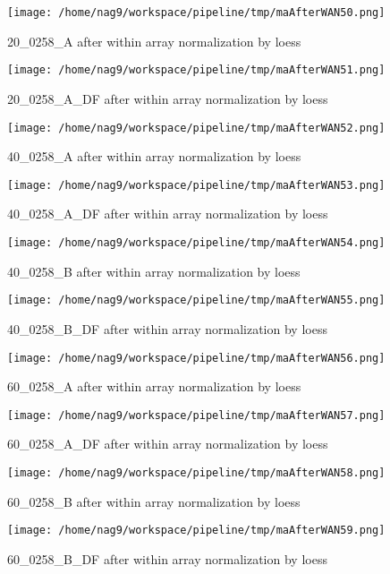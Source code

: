 \documentclass[titlepage]{article}
\begin{document}
\begin{figure}[htb!]
\centering\texttt{[image: /home/nag9/workspace/pipeline/tmp/maAfterWAN50.png]}
\caption{20\_0258\_A after within array normalization by loess}
 \end{figure}\pagebreak
\begin{figure}[htb!]
\centering\texttt{[image: /home/nag9/workspace/pipeline/tmp/maAfterWAN51.png]}
\caption{20\_0258\_A\_DF after within array normalization by loess}
 \end{figure}\pagebreak
\begin{figure}[htb!]
\centering\texttt{[image: /home/nag9/workspace/pipeline/tmp/maAfterWAN52.png]}
\caption{40\_0258\_A after within array normalization by loess}
 \end{figure}\pagebreak
\begin{figure}[htb!]
\centering\texttt{[image: /home/nag9/workspace/pipeline/tmp/maAfterWAN53.png]}
\caption{40\_0258\_A\_DF after within array normalization by loess}
 \end{figure}\pagebreak
\begin{figure}[htb!]
\centering\texttt{[image: /home/nag9/workspace/pipeline/tmp/maAfterWAN54.png]}
\caption{40\_0258\_B after within array normalization by loess}
 \end{figure}\pagebreak
\begin{figure}[htb!]
\centering\texttt{[image: /home/nag9/workspace/pipeline/tmp/maAfterWAN55.png]}
\caption{40\_0258\_B\_DF after within array normalization by loess}
 \end{figure}\pagebreak
\begin{figure}[htb!]
\centering\texttt{[image: /home/nag9/workspace/pipeline/tmp/maAfterWAN56.png]}
\caption{60\_0258\_A after within array normalization by loess}
 \end{figure}\pagebreak
\begin{figure}[htb!]
\centering\texttt{[image: /home/nag9/workspace/pipeline/tmp/maAfterWAN57.png]}
\caption{60\_0258\_A\_DF after within array normalization by loess}
 \end{figure}\pagebreak
\begin{figure}[htb!]
\centering\texttt{[image: /home/nag9/workspace/pipeline/tmp/maAfterWAN58.png]}
\caption{60\_0258\_B after within array normalization by loess}
 \end{figure}\pagebreak
\begin{figure}[htb!]
\centering\texttt{[image: /home/nag9/workspace/pipeline/tmp/maAfterWAN59.png]}
\caption{60\_0258\_B\_DF after within array normalization by loess}
 \end{figure}\pagebreak
\end{document}
